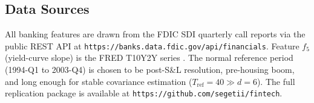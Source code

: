 \documentclass[final]{siamltex}
\begin{document}
\begin{appendix}
\section{Data Sources}\label{app:data}

All banking features are drawn from the FDIC SDI quarterly call
reports \cite{fdic2024sdi} via the public REST API at
\texttt{https://banks.data.fdic.gov/api/financials}. Feature $f_5$
(yield-curve slope) is the FRED T10Y2Y series \cite{fred2024}. The normal reference
period (1994-Q1 to 2003-Q4) is chosen to be post-S\&L resolution,
pre-housing boom, and long enough for stable covariance estimation
($T_{\mathrm{ref}}=40\gg d=6$). The full replication package is
available at
\texttt{https://github.com/segetii/fintech}.



\end{appendix}
\end{document}
